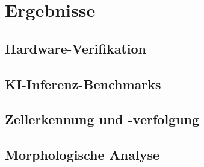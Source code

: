 \chapter{Ergebnisse}
\label{chap:ergebnisse}

\section{Hardware-Verifikation}

\section{KI-Inferenz-Benchmarks}

\section{Zellerkennung und -verfolgung}

\section{Morphologische Analyse}